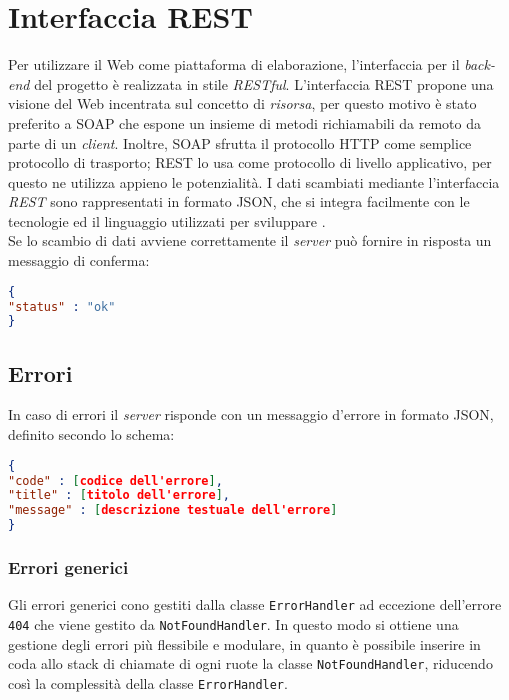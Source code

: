 \newpage
\section{Interfaccia REST}
Per utilizzare il Web come piattaforma di elaborazione, l'interfaccia per il \textit{back-end} del progetto \textit{\progetto} è realizzata in stile \textit{RESTful}.
L'interfaccia REST propone una visione del Web incentrata sul concetto di \textit{risorsa}, per questo motivo è stato preferito a SOAP che espone un insieme di metodi richiamabili da remoto da parte di un \textit{client}. Inoltre, SOAP sfrutta il protocollo HTTP come semplice protocollo di trasporto; REST lo usa come  protocollo di livello applicativo, per questo ne utilizza appieno le potenzialità.
I dati scambiati mediante l'interfaccia \textit{REST} sono rappresentati in formato JSON, che si integra facilmente con le tecnologie ed il linguaggio utilizzati per sviluppare \progetto. \\
Se lo scambio di dati avviene correttamente il \textit{server} può fornire in risposta un messaggio di conferma:
\begin{lstlisting}[language=json,firstnumber=1]
{
"status" : "ok"
}
\end{lstlisting}
\subsection{Errori}
In caso di errori il \textit{server} risponde con un messaggio d'errore in formato JSON, definito secondo lo schema:
\begin{lstlisting}[language=json,firstnumber=1]
{
"code" : [codice dell'errore],
"title" : [titolo dell'errore],
"message" : [descrizione testuale dell'errore]
}
\end{lstlisting}
\subsubsection{Errori generici}
Gli errori generici cono gestiti dalla classe \texttt{ErrorHandler} ad eccezione dell'errore \texttt{404} che viene gestito da \texttt{NotFoundHandler}. In questo modo si ottiene una gestione degli errori più flessibile e modulare, in quanto è possibile inserire in coda allo stack di chiamate di ogni ruote la classe \texttt{NotFoundHandler}, riducendo così la complessità della classe \texttt{ErrorHandler}.

